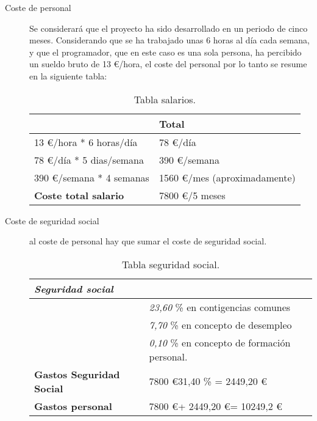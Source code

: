 \begin{description}
	\item[Coste de personal] Se considerará que el proyecto ha sido desarrollado en un periodo de cinco meses.  Considerando que se ha trabajado unas 6 horas al día cada semana, y que el programador, que en este caso es una sola persona, ha percibido un sueldo bruto de 13 \euro /hora, el coste del personal por lo tanto se resume en la siguiente tabla:
	
\begin{table}[htbp]
\begin{center}
\begin{tabular}{|l|l|}
\hline
 & Total \\
\hline \hline
13 \euro /hora * 6 horas/día &   78 \euro /día \\ \hline
78 \euro /día * 5 dias/semana &   390 \euro /semana \\ \hline
390 \euro /semana * 4 semanas &   1560 \euro /mes (aproximadamente)\\ \hline
\textbf{Coste total salario} &   7800 \euro /5 meses \\ \hline
\end{tabular}
\caption{Tabla salarios.}
\label{tabla:salarios}
\end{center}
\end{table}
	
	\item[Coste de seguridad social] al coste de personal hay que sumar el coste de seguridad social. 
	
	
	\begin{table}[htbp]
\begin{center}
\begin{tabular}{|l|l|}
\hline
 \emph{Seguridad social} &  \\
\hline \hline
 & \emph{23,60} \% en contigencias comunes \\ \hline
&   \emph{7,70} \% en concepto de desempleo \\ \hline
 &   \emph{0,10} \% en concepto de formación personal. \\ \hline
\textbf{Gastos Seguridad Social}  &   7800 \euro  * 31,40 \% =  2449,20 \euro \\ \hline
\textbf{Gastos personal}  &  7800 \euro  + 2449,20 \euro  = 10249,2 \euro  \\ \hline
\end{tabular}
\caption{Tabla seguridad social.}
\label{tabla:ssocial}
\end{center}
\end{table}
	

\end{description}
